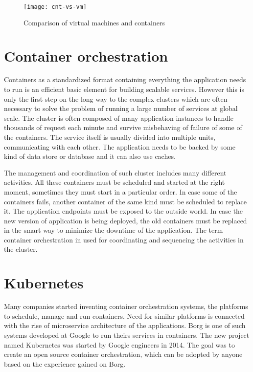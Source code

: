 \documentclass[
  digital, %
  twoside, %
  table,   %
  lof,     %
  lot,     %
]{fithesis3}
\begin{document}
\begin{figure}[H]
\caption{Comparison of virtual machines and containers}
\centering
\texttt{[image: cnt-vs-vm]}
\label{fig:cnt-vs-vm}
\end{figure}

\section{Container orchestration} \label{sec:orchestration}
Containers as a standardized format containing everything the application needs to run is an efficient basic element for building scalable services. However this is only the first step on the long way to the complex clusters which are often necessary to solve the problem of running a large number of services at global scale. The cluster is often composed of many application instances to handle thousands of request each minute and survive misbehaving of failure of some of the containers. The service itself is usually divided into multiple units, communicating with each other. The application needs to be backed by some kind of data store or database and it can also use caches.

The management and coordination of such cluster includes many different activities. All these containers must be scheduled and started at the right moment, sometimes they must start in a particular order. In case some of the containers fails, another container of the same kind must be scheduled to replace it. The application endpoints must be exposed to the outside world. In case the new version of application is being deployed, the old containers must be replaced in the smart way to minimize the downtime of the application. The term container orchestration in used for coordinating and sequencing the activities in the cluster.

\section{Kubernetes} \label{sec:k8s}
Many companies started inventing container orchestration systems, the platforms to schedule, manage and run containers. Need for similar platforms is connected with the rise of microservice architecture of the applications. Borg \cite{borg} is one of such systems developed at Google to run theirs services in containers. The new project named Kubernetes was started by Google engineers in 2014. The goal was to create an open source container orchestration, which can be adopted by anyone based on the experience gained on Borg.
\end{document}
